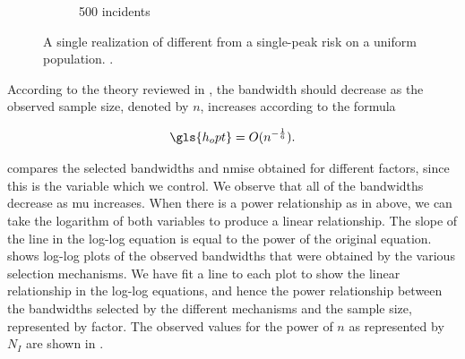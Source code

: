 \begin{figure}[htbp]
\begin{subfigure}{0.45\textwidth}
        \caption{500 incidents}
    \end{subfigure}
        \caption[A single realization of different ]
            {A single realization of different  from a single-peak risk on a uniform population.
            \scatterplotcaption.}
        \label{fig:one_sample:unif_NCases_1h}
\end{figure}

According to the theory reviewed in ,
the bandwidth should decrease as the observed sample size,
denoted by $n$,
increases according to the formula

\begin{equation}
    \label{eq:h_opt}
    \gls{h_opt} = O(n^{-\frac{1}{6}}) \text{.}
\end{equation}

 compares the selected bandwidths and \gls{nmise} obtained for different \glspl{factor},
since this is the variable which we control.
We observe that all of the bandwidths decrease as \gls{mu} increases.
When there is a power relationship as in  above, we can take the logarithm of both variables to produce a linear relationship.
The slope of the line in the log-log equation is equal to the power of the original equation.
 shows log-log plots of the observed bandwidths that were obtained by the various selection mechanisms.
We have fit a line to each plot to show the linear relationship in the log-log equations, and hence the power relationship between the bandwidths selected by the different mechanisms and the sample size, represented by \gls{factor}.
The observed values for the power of $n$ as represented by $N_I$ are shown in .






